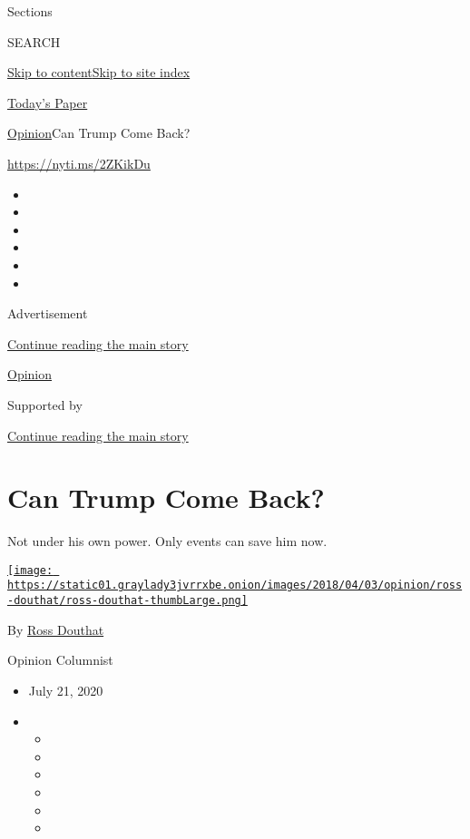 Sections

SEARCH

\protect\hyperlink{site-content}{Skip to
content}\protect\hyperlink{site-index}{Skip to site index}

\href{https://myaccount.nytimes3xbfgragh.onion/auth/login?response_type=cookie\&client_id=vi}{}

\href{https://www.nytimes3xbfgragh.onion/section/todayspaper}{Today's
Paper}

\href{/section/opinion}{Opinion}\textbar{}Can Trump Come Back?

\url{https://nyti.ms/2ZKikDu}

\begin{itemize}
\item
\item
\item
\item
\item
\item
\end{itemize}

Advertisement

\protect\hyperlink{after-top}{Continue reading the main story}

\href{/section/opinion}{Opinion}

Supported by

\protect\hyperlink{after-sponsor}{Continue reading the main story}

\hypertarget{can-trump-come-back}{%
\section{Can Trump Come Back?}\label{can-trump-come-back}}

Not under his own power. Only events can save him now.

\href{https://www.nytimes3xbfgragh.onion/by/ross-douthat}{\texttt{[image: https://static01.graylady3jvrrxbe.onion/images/2018/04/03/opinion/ross-douthat/ross-douthat-thumbLarge.png]}}

By \href{https://www.nytimes3xbfgragh.onion/by/ross-douthat}{Ross
Douthat}

Opinion Columnist

\begin{itemize}
\item
  July 21, 2020
\item
  \begin{itemize}
  \item
  \item
  \item
  \item
  \item
  \item
  \end{itemize}
\end{itemize}

